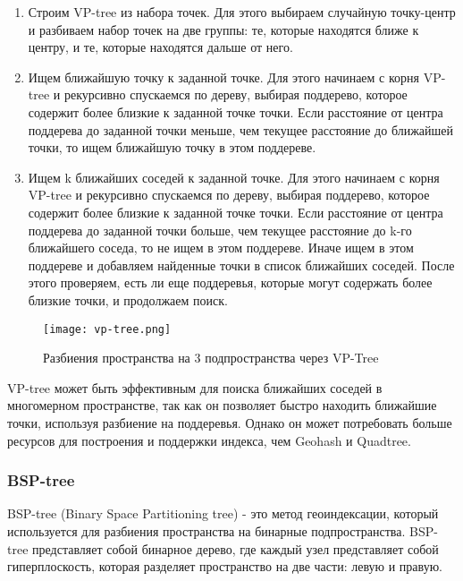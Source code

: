 \begin{enumerate}
    \item Строим VP-tree из набора точек. Для этого выбираем случайную точку-центр и разбиваем набор точек на две группы: те, которые находятся ближе к центру, и те, которые находятся дальше от него.
    \item Ищем ближайшую точку к заданной точке. Для этого начинаем с корня VP-tree и рекурсивно спускаемся по дереву, выбирая поддерево, которое содержит более близкие к заданной точке точки. Если расстояние от центра поддерева до заданной точки меньше, чем текущее расстояние до ближайшей точки, то ищем ближайшую точку в этом поддереве.
    \item Ищем k ближайших соседей к заданной точке. Для этого начинаем с корня VP-tree и рекурсивно спускаемся по дереву, выбирая поддерево, которое содержит более близкие к заданной точке точки. Если расстояние от центра поддерева до заданной точки больше, чем текущее расстояние до k-го ближайшего соседа, то не ищем в этом поддереве. Иначе ищем в этом поддереве и добавляем найденные точки в список ближайших соседей. После этого проверяем, есть ли еще поддеревья, которые могут содержать более близкие точки, и продолжаем поиск.
\end{enumerate}

\begin{figure}[h]
    \centering
    \texttt{[image: vp-tree.png]}
    \caption{Разбиения пространства на 3 подпространства через VP-Tree}
\end{figure}

VP-tree может быть эффективным для поиска ближайших соседей в многомерном пространстве, так как он позволяет быстро находить ближайшие точки, используя разбиение на поддеревья. Однако он может потребовать больше ресурсов для построения и поддержки индекса, чем Geohash и Quadtree.

\subsubsection{BSP-tree}
BSP-tree (Binary Space Partitioning tree) - это метод геоиндексации, который используется для разбиения пространства на бинарные подпространства. BSP-tree представляет собой бинарное дерево, где каждый узел представляет собой гиперплоскость, которая разделяет пространство на две части: левую и правую.

